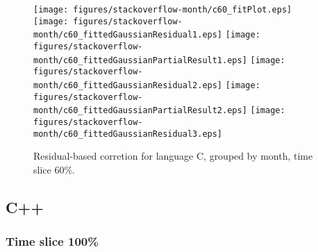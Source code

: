 \begin{figure}[hb]
\centering
{}
{\texttt{[image: figures/stackoverflow-month/c60\_fitPlot.eps]}}
{\texttt{[image: figures/stackoverflow-month/c60\_fittedGaussianResidual1.eps]}}
{\texttt{[image: figures/stackoverflow-month/c60\_fittedGaussianPartialResult1.eps]}}
{\texttt{[image: figures/stackoverflow-month/c60\_fittedGaussianResidual2.eps]}}
{\texttt{[image: figures/stackoverflow-month/c60\_fittedGaussianPartialResult2.eps]}}
{\texttt{[image: figures/stackoverflow-month/c60\_fittedGaussianResidual3.eps]}}
\caption{Residual-based corretion for language C, grouped by month, time slice 60\%.}
\end{figure}


\clearpage 
\newpage 


\subsection{C++}

\FloatBarrier

\subsubsection{Time slice 100\%}

